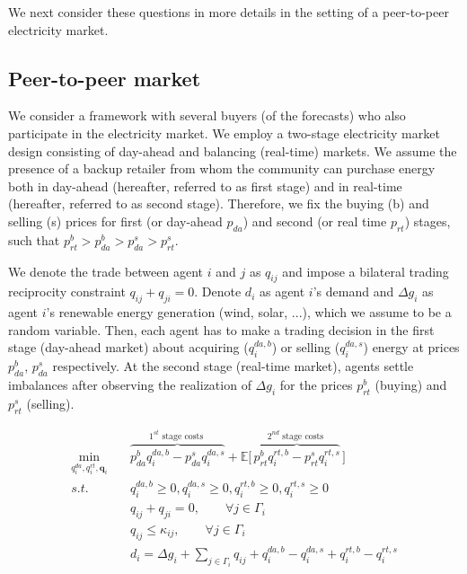\documentclass{article}
\begin{document}
We next consider these questions in more details in the setting of a peer-to-peer electricity market.

\subsection{Peer-to-peer market}
We consider a framework with several buyers (of the forecasts) who also participate in the electricity market. We employ a two-stage electricity market design consisting of day-ahead and balancing (real-time) markets. We assume the presence of a backup retailer from whom the community can purchase energy both in day-ahead (hereafter, referred to as first stage) and in real-time (hereafter, referred to as second stage). Therefore, we fix the buying (b) and selling (s) prices for first (or day-ahead $p_{da}$) and second (or real time $p_{rt}$) stages, such that $p^b_{rt} > p^{b}_{da} > p^{s}_{da} > p^s_{rt}$.

We denote the trade between agent $i$ and $j$ as $q_{ij}$ and impose a bilateral trading reciprocity constraint $q_{ij} + q_{ji} = 0$. Denote $d_i$ as agent $i$'s demand and $\Delta g_i$ as agent $i$'s renewable energy generation (wind, solar, ...), which we assume to be a random variable. Then, each agent has to make a trading decision in the first stage (day-ahead market) about acquiring ($q^{da,b}_i$) or selling ($q^{da,s}_i$) energy at prices $p^{b}_{da}$, $p^{s}_{da}$ respectively. At the second stage (real-time market), agents settle imbalances after observing the realization of $\Delta g_i$ for the prices $p^{b}_{rt}$ (buying) and $p^{s}_{rt}$ (selling). 

\begin{equation}\label{eq: two-stage initial formulation}
    \begin{aligned}
        \min_{q^{da}_i, q^{rt}_i, \mathbf{q}_{i}} \quad &  \overbrace{p^b_{da} q^{da,b}_i - p^s_{da} q^{da,s}_i}^{1^{st} \text{ stage costs }} + \mathbb{E}\Big[\,\overbrace{p^b_{rt} q^{rt, b}_i - p^s_{rt} q^{rt,s}_i}^{2^{nd} \text{ stage costs }} \,\Big] \\
        s.t. \quad & q^{da,b}_i \geq 0, q^{da,s}_i \geq 0, q^{rt,b}_i \geq 0, q^{rt,s}_i \geq 0\\
        & q_{ij} + q_{ji} = 0, \qquad \forall j \in \Gamma_i\\
        & q_{ij} \leq \kappa_{ij}, \qquad \forall j \in \Gamma_i \\
        & d_i = \Delta g_i + \sum_{j \in \Gamma_i} q_{ij} + q^{da,b}_i - q^{da,s}_i + q^{rt,b}_i - q^{rt,s}_i\\
    \end{aligned}
\end{equation}
\end{document}
